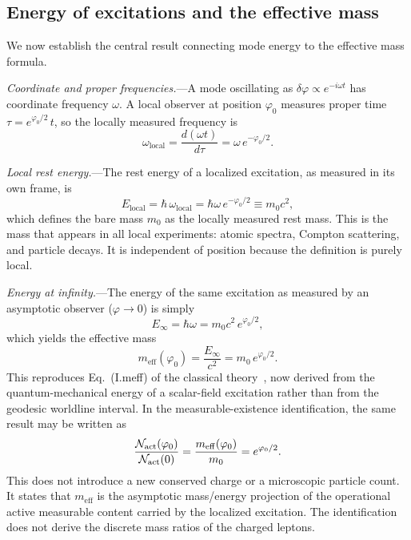 \documentclass[aps,prd,onecolumn,superscriptaddress,nofootinbib,showpacs,12pt,notitlepage]{revtex4-2}
\newcommand{\meff}{m_{\mathrm{eff}}}
\begin{document}
\subsection{Energy of excitations and the effective mass}
\label{sec:mode_energy}

We now establish the central result connecting mode
energy to the effective mass formula.

\textit{Coordinate and proper frequencies.}---A mode
oscillating as $\delta\varphi \propto e^{-i\omega t}$
has coordinate frequency $\omega$.  A local observer
at position $\varphi_0$ measures proper time
$\tau = e^{\varphi_0/2}\,t$, so the locally measured
frequency is
\begin{equation}\label{eq:omega_local}
  \omega_{\mathrm{local}}
  = \frac{d(\omega t)}{d\tau}
  = \omega\,e^{-\varphi_0/2}.
\end{equation}

\textit{Local rest energy.}---The rest energy of a
localized excitation, as measured in its own frame, is
\begin{equation}\label{eq:E_local}
  E_{\mathrm{local}} = \hbar\,\omega_{\mathrm{local}}
  = \hbar\omega\,e^{-\varphi_0/2}
  \equiv m_0 c^{2},
\end{equation}
which defines the bare mass $m_0$ as the locally
measured rest mass.  This is the mass that appears in
all local experiments: atomic spectra, Compton scattering,
and particle decays.  It is independent of position
because the definition is purely local.

\textit{Energy at infinity.}---The energy of the same
excitation as measured by an asymptotic observer
($\varphi \to 0$) is simply
\begin{equation}\label{eq:E_inf}
  E_{\infty} = \hbar\omega = m_0 c^{2}\,e^{\varphi_0/2},
\end{equation}
which yields the effective mass
\begin{equation}\label{eq:meff_quantum}
  \boxed{
  \meff(\varphi_0) = \frac{E_{\infty}}{c^2}
  = m_0\,e^{\varphi_0/2}.
  }
\end{equation}
This reproduces Eq.~(I.meff) of the classical
theory~\cite{Lotishvili2026}, now derived from the
quantum-mechanical energy of a scalar-field excitation
rather than from the geodesic worldline interval.
In the measurable-existence identification, the same result may be written
as
\begin{equation}\label{eq:Nact_quantum}
  \frac{\mathcal N_{\rm act}(\varphi_0)}
       {\mathcal N_{\rm act}(0)}
  =
  \frac{\meff(\varphi_0)}{m_0}
  =
  e^{\varphi_0/2}.
\end{equation}
This does not introduce a new conserved charge or a microscopic particle
count.  It states that $\meff$ is the asymptotic mass/energy projection of
the operational active measurable content carried by the localized
excitation.  The identification does not derive the discrete mass ratios of
the charged leptons.
\end{document}
